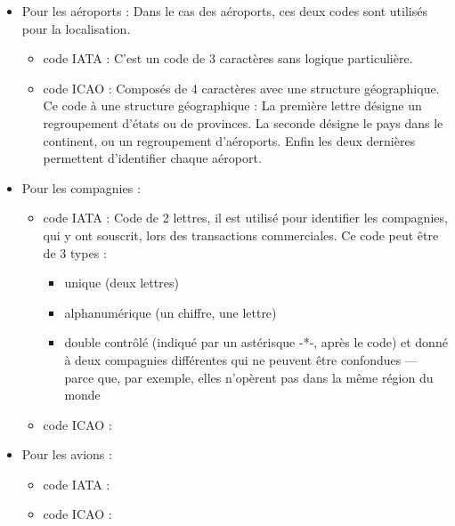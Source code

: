 \documentclass{article}
\begin{document}
    \begin{itemize}
        \item Pour les aéroports :
        \newline
        Dans le cas des aéroports, ces deux codes sont utilisés pour la localisation.
        \begin{itemize}
            \item code IATA : C'est un code de 3 caractères sans logique particulière.
            \item code ICAO : Composés de 4 caractères avec une structure géographique. Ce code à une structure géographique : La première lettre désigne un regroupement d'états ou de provinces. La seconde désigne le pays dans le continent, ou un regroupement d'aéroports. Enfin les deux dernières permettent d'identifier chaque aéroport.
        \end{itemize}
            \item Pour les compagnies :
        \begin{itemize}
            \item code IATA : Code de 2 lettres, il est utilisé pour identifier les compagnies, qui y ont souscrit, lors des transactions commerciales. Ce code peut être de 3 types :
            \begin{itemize}
                \item unique (deux lettres)
                \item alphanumérique (un chiffre, une lettre)
                \item double contrôlé (indiqué par un astérisque -*-, après le code) et donné à deux compagnies différentes qui ne peuvent être confondues — parce que, par exemple, elles n'opèrent pas dans la même région du monde
            \end{itemize}
            \item code ICAO :
        \end{itemize}
            \item Pour les avions :
        \begin{itemize}
            \item code IATA :
            \item code ICAO :
        \end{itemize}
    \end{itemize}



    \newpage


\end{document}
